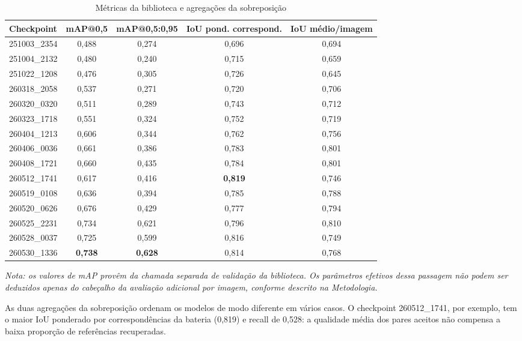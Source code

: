 \begin{table}[htb]
\centering
\caption{M\'etricas da biblioteca e agrega\c{c}\~oes da sobreposi\c{c}\~ao}
\label{tab:metricas-biblioteca}
\small
\begin{tabular}{lcccc}
\hline
\textbf{Checkpoint} & \textbf{mAP@0,5} & \textbf{mAP@0,5:0,95} & \textbf{IoU pond. correspond.} & \textbf{IoU m\'edio/imagem} \\
\hline
251003\_2354 & 0,488 & 0,274 & 0,696 & 0,694 \\
251004\_2132 & 0,480 & 0,240 & 0,715 & 0,659 \\
251022\_1208 & 0,476 & 0,305 & 0,726 & 0,645 \\
260318\_2058 & 0,537 & 0,271 & 0,720 & 0,706 \\
260320\_0320 & 0,511 & 0,289 & 0,743 & 0,712 \\
260323\_1718 & 0,551 & 0,324 & 0,752 & 0,719 \\
260404\_1213 & 0,606 & 0,344 & 0,762 & 0,756 \\
260406\_0036 & 0,661 & 0,386 & 0,783 & 0,801 \\
260408\_1721 & 0,660 & 0,435 & 0,784 & 0,801 \\
260512\_1741 & 0,617 & 0,416 & \textbf{0,819} & 0,746 \\
260519\_0108 & 0,636 & 0,394 & 0,785 & 0,788 \\
260520\_0626 & 0,676 & 0,429 & 0,777 & 0,794 \\
260525\_2231 & 0,734 & 0,621 & 0,796 & 0,810 \\
260528\_0037 & 0,725 & 0,599 & 0,816 & 0,749 \\
260530\_1336 & \textbf{0,738} & \textbf{0,628} & 0,814 & 0,768 \\
\hline
\end{tabular}

\vspace{0.3cm}
\footnotesize \textit{Nota: os valores de mAP prov\^em da chamada separada de valida\c{c}\~ao da biblioteca. Os par\^ametros efetivos dessa passagem n\~ao podem ser deduzidos apenas do cabe\c{c}alho da avalia\c{c}\~ao adicional por imagem, conforme descrito na Metodologia.}
\end{table}

As duas agrega\c{c}\~oes da sobreposi\c{c}\~ao ordenam os modelos de modo diferente em v\'arios casos. O checkpoint 260512\_1741, por exemplo, tem o maior IoU ponderado por correspond\^encias da bateria (0,819) e recall de 0,528: a qualidade m\'edia dos pares aceitos n\~ao compensa a baixa propor\c{c}\~ao de refer\^encias recuperadas.

